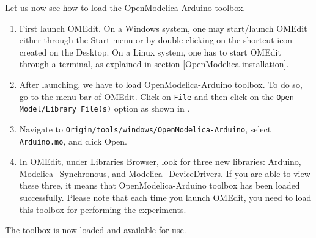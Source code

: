 Let us now see how to load the OpenModelica Arduino toolbox. 
\begin{enumerate}
      \item First launch OMEdit. On a Windows system, one may start/launch
            OMEdit either through the Start menu or by double-clicking on the
            shortcut icon created on the Desktop. On a Linux system, one has to
            start OMEdit through a terminal, as
            explained in section \ref{OpenModelica-installation}.
      \item After launching, we have to load OpenModelica-Arduino
            toolbox. To do so, go to the menu bar of OMEdit. 
            Click on {\tt File} and then click on
            the {\tt Open Model/Library File(s)} option as shown in .
      \item Navigate to {\tt Origin/tools/windows/OpenModelica-Arduino}, select \\ {\tt Arduino.mo},
            and click Open. 
      \item In OMEdit, under Libraries Browser, look for three new libraries: Arduino,
            Modelica\_Synchronous, and Modelica\_DeviceDrivers. If you are able to view these three,
            it means that OpenModelica-Arduino toolbox has been loaded successfully. 
            Please note that each time you launch OMEdit, you need to load this toolbox for
            performing the experiments. 
\end{enumerate}
The toolbox is now loaded and available for use.




